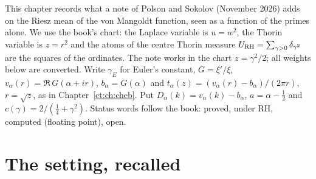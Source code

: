 \label{xf:ch:primes}

This chapter records what a note of Polson and Sokolov (November 2026) adds on the Riesz mean of the von Mangoldt function, seen as a function of the primes alone. We use the book's chart: the Laplace variable is $u=w^2$, the Thorin variable is $z=r^2$ and the atoms of the centre Thorin measure $U_{\rm RH}=\sum_{\gamma>0}\delta_{\gamma^2}$ are the squares of the ordinates. The note works in the chart $z=\gamma^2/2$; all weights below are converted. Write $\gamma_E$ for Euler's constant, $G=\xi'/\xi$, $v_\alpha(r)=\Re\,G(\alpha+ir)$, $b_\alpha=G(\alpha)$ and $t_\alpha(z)=(v_\alpha(r)-b_\alpha)/(2\pi r)$, $r=\sqrt z$, as in Chapter~\ref{ct:ch:cheb}. Put $D_\alpha(k)=v_\alpha(k)-b_\alpha$, $a=\alpha-\frac12$ and $c(\gamma)=2/(\frac14+\gamma^2)$. Status words follow the book: proved, under RH, computed (floating point), open.

\section{The setting, recalled}

